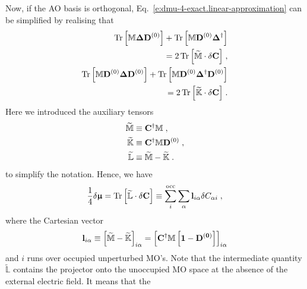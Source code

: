 \documentclass[aip,amsmath,amssymb,reprint]{revtex4-1}
\newcommand{\BM}[1]{\bm{#1}}
\DeclareMathOperator{\Tr}{Tr}
\begin{document}
Now, if the AO basis is orthogonal, Eq.~\eqref{e:dmu-4-exact.linear-approximation} can be simplified by realising that
%
\begin{subequations}
 \begin{align}
  \Tr{ 
    \left[ 
         {\mathbb{M}} {\BM\Delta} {\bf D}^{(0)}  
    \right] }
%
  +\Tr{ 
    \left[ 
         {\mathbb{M}} {\bf D}^{(0)} {\BM\Delta}^{\dagger}
    \right] }
  & \\ \nonumber =
2 \Tr{ 
    \left[ 
         \widetilde{\mathbb{M}} \cdot \delta {\bf C}
   \right] }  \;,
%
\\
%
  \Tr{ 
    \left[ 
         {\mathbb{M}} {\bf D}^{(0)} {\BM\Delta} {\bf D}^{(0)}
    \right] }
%
 +\Tr{ 
    \left[ 
         {\mathbb{M}} {\bf D}^{(0)} {\BM\Delta}^{\dagger} {\bf D}^{(0)}
    \right] }
  & \\ \nonumber =
2 \Tr{ 
    \left[ 
         \widetilde{\mathbb{K}} \cdot \delta {\bf C}
   \right] } \;.
%
 \end{align}
\end{subequations}
%
Here we introduced the auxiliary tensors
%
\begin{subequations}
 \begin{align}
   \widetilde{\mathbb{M}}  &\equiv {\bf C}^\dagger {\mathbb{M}}     \;,           \\
   \widetilde{\mathbb{K}}  &\equiv {\bf C}^\dagger {\mathbb{M}} {\bf D}^{(0)} \;, \\
   \widetilde{\mathbb{L}}  &\equiv \widetilde{\mathbb{M}} - \widetilde{\mathbb{K}} \;.
 \end{align}
\end{subequations}
%
to simplify the notation. Hence, we have
%
\begin{equation} \label{e:dmu-l-vector}
  \frac{1}{4} 
 \delta {\BM{\upmu}} %
   =
   \Tr{ 
    \left[ 
         \widetilde{\mathbb{L}} \cdot \delta {\bf C}
    \right] }
   \equiv \sum_{i}^{\rm occ} \sum_\alpha {\bf l}_{i\alpha} \delta C_{\alpha i} \;,
\end{equation}
%
where the Cartesian vector
%
\begin{equation}\label{e:l-vector}
 {\bf l}_{i\alpha} \equiv \left[ \widetilde{\mathbb{M}} - \widetilde{\mathbb{K}} \right]_{i\alpha} 
      = \left[  {\bf C}^\dagger \mathbb{M} \left[ \bf{1} - \bf{D}^{(0)} \right] \right]_{i\alpha}
\end{equation}
%
and $i$ runs over occupied unperturbed MO's.
Note that the intermediate quantity $\widetilde{\mathbb{L}}$ contains the projector onto
the unoccupied MO space at the absence of the external electric field. It means that the
\end{document}
